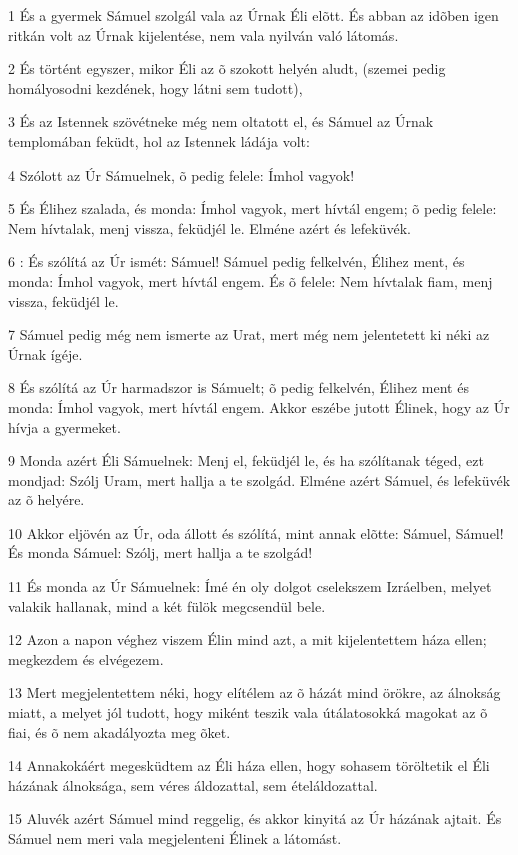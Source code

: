 \par 1 És a gyermek Sámuel szolgál vala az Úrnak Éli elõtt. És abban az idõben igen ritkán volt az Úrnak kijelentése, nem vala nyilván való látomás.
\par 2 És történt egyszer, mikor Éli az õ szokott helyén aludt, (szemei pedig homályosodni kezdének, hogy látni sem tudott),
\par 3 És az Istennek szövétneke még nem oltatott el, és Sámuel az Úrnak templomában feküdt, hol az Istennek ládája volt:
\par 4 Szólott az Úr Sámuelnek, õ pedig felele: Ímhol vagyok!
\par 5 És Élihez szalada, és monda: Ímhol vagyok, mert hívtál engem; õ pedig felele: Nem hívtalak, menj vissza, feküdjél le. Elméne azért és lefeküvék.
\par 6 : És szólítá az Úr ismét: Sámuel! Sámuel pedig felkelvén, Élihez ment, és monda: Ímhol vagyok, mert hívtál engem. És õ felele: Nem hívtalak fiam, menj vissza, feküdjél le.
\par 7 Sámuel pedig még nem ismerte az Urat, mert még nem jelentetett ki néki az Úrnak ígéje.
\par 8 És szólítá az Úr harmadszor is Sámuelt; õ pedig felkelvén, Élihez ment és monda: Ímhol vagyok, mert hívtál engem. Akkor eszébe jutott Élinek, hogy az Úr hívja a gyermeket.
\par 9 Monda azért Éli Sámuelnek: Menj el, feküdjél le, és ha szólítanak téged, ezt mondjad: Szólj Uram, mert hallja a te szolgád. Elméne azért Sámuel, és lefeküvék az õ helyére.
\par 10 Akkor eljövén az Úr, oda állott és szólítá, mint annak elõtte: Sámuel, Sámuel! És monda Sámuel: Szólj, mert hallja a te szolgád!
\par 11 És monda az Úr Sámuelnek: Ímé én oly dolgot cselekszem Izráelben, melyet valakik hallanak, mind a két fülök megcsendül bele.
\par 12 Azon a napon véghez viszem Élin mind azt, a mit kijelentettem háza ellen; megkezdem és elvégezem.
\par 13 Mert megjelentettem néki, hogy elítélem az õ házát mind örökre, az álnokság miatt, a melyet jól tudott, hogy miként teszik vala útálatosokká magokat az õ fiai, és õ nem akadályozta meg õket.
\par 14 Annakokáért megesküdtem az Éli háza ellen, hogy sohasem töröltetik el Éli házának álnoksága, sem véres áldozattal, sem ételáldozattal.
\par 15 Aluvék azért Sámuel mind reggelig, és akkor kinyitá az Úr házának ajtait. És Sámuel nem meri vala megjelenteni Élinek a látomást.
